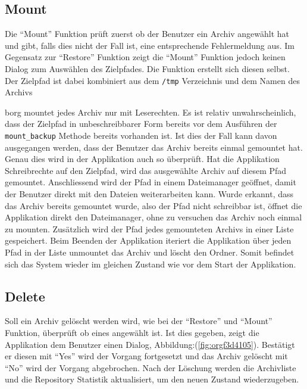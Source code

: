 \newpage
\subsection{Mount}
\label{sec:orgb1a6a89}

Die "`Mount"' Funktion prüft zuerst ob der Benutzer ein Archiv angewählt hat und
gibt, falls dies nicht der Fall ist, eine entsprechende Fehlermeldung aus. Im
Gegensatz zur "`Restore"' Funktion zeigt die "`Mount"' Funktion jedoch keinen
Dialog zum Auswählen des Zielpfades. Die Funktion erstellt sich diesen selbst.
Der Zielpfad ist dabei kombiniert aus dem \texttt{/tmp} Verzeichnis und dem Namen des
Archivs

\gls{borg} mountet jedes Archiv nur mit Leserechten. Es ist relativ
unwahrscheinlich, dass der Zielpfad in unbeschreibbarer Form bereits vor dem
Ausführen der \texttt{mount\_backup} Methode bereits vorhanden ist. Ist dies der Fall
kann davon ausgegangen werden, dass der Benutzer das Archiv bereits einmal
gemountet hat. Genau dies wird in der Applikation auch so überprüft. Hat die
Applikation Schreibrechte auf den Zielpfad, wird das ausgewählte Archiv auf
diesem Pfad gemountet. Anschliessend wird der Pfad in einem Dateimanager
geöffnet, damit der Benutzer direkt mit den Dateien weiterarbeiten kann. Wurde
erkannt, dass das Archiv bereits gemountet wurde, also der Pfad nicht
schreibbar ist, öffnet die Applikation direkt den Dateimanager, ohne zu
versuchen das Archiv noch einmal zu mounten.
\newpage
Zusätzlich wird der Pfad jedes gemounteten Archivs in einer Liste gespeichert.
Beim Beenden der Applikation iteriert die Applikation über jeden Pfad in der
Liste unmountet das Archiv und löscht den Ordner. Somit befindet sich das
System wieder im gleichen Zustand wie vor dem Start der Applikation.

\subsection{Delete}
\label{sec:org387e3f8}

Soll ein Archiv gelöscht werden wird, wie bei der "`Restore"' und "`Mount"'
Funktion, überprüft ob eines angewählt ist. Ist dies gegeben, zeigt die
Applikation dem Benutzer einen Dialog, Abbildung:(\ref{fig:orgf3d4105}). Bestätigt er
diesen mit "`Yes"' wird der Vorgang fortgesetzt und das Archiv gelöscht mit "`No"'
wird der Vorgang abgebrochen. Nach der Löschung werden die Archivliste und die
Repository Statistik aktualisiert, um den neuen Zustand wiederzugeben.

